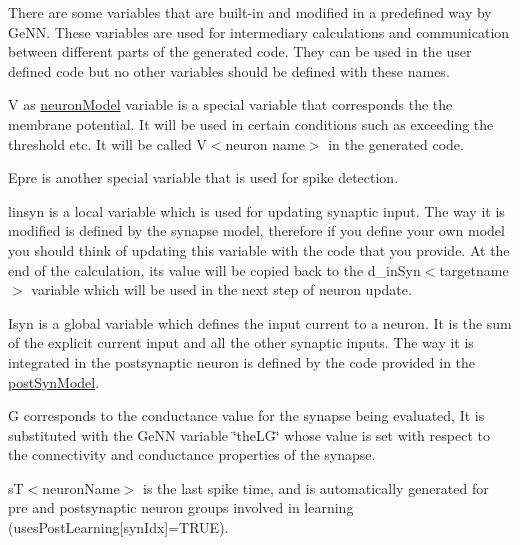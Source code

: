 There are some variables that are built-\/in and modified in a predefined way by Ge\+N\+N. These variables are used for intermediary calculations and communication between different parts of the generated code. They can be used in the user defined code but no other variables should be defined with these names.

{\ttfamily V} as \hyperlink{structneuronModel}{neuron\+Model} variable is a special variable that corresponds the the membrane potential. It will be used in certain conditions such as exceeding the threshold etc. It will be called V$<$neuron name$>$ in the generated code.

{\ttfamily Epre} is another special variable that is used for spike detection.

{\ttfamily linsyn} is a local variable which is used for updating synaptic input. The way it is modified is defined by the synapse model, therefore if you define your own model you should think of updating this variable with the code that you provide. At the end of the calculation, its value will be copied back to the d\+\_\+in\+Syn$<$targetname$>$ variable which will be used in the next step of neuron update.

{\ttfamily Isyn} is a global variable which defines the input current to a neuron. It is the sum of the explicit current input and all the other synaptic inputs. The way it is integrated in the postsynaptic neuron is defined by the code provided in the \hyperlink{structpostSynModel}{post\+Syn\+Model}.

{\ttfamily G} corresponds to the conductance value for the synapse being evaluated, It is substituted with the Ge\+N\+N variable \char`\"{}the\+L\+G\char`\"{} whose value is set with respect to the connectivity and conductance properties of the synapse.

{\ttfamily s\+T$<$neuron\+Name$>$} is the last spike time, and is automatically generated for pre and postsynaptic neuron groups involved in learning (uses\+Post\+Learning\mbox{[}syn\+Idx\mbox{]}=T\+R\+U\+E). 